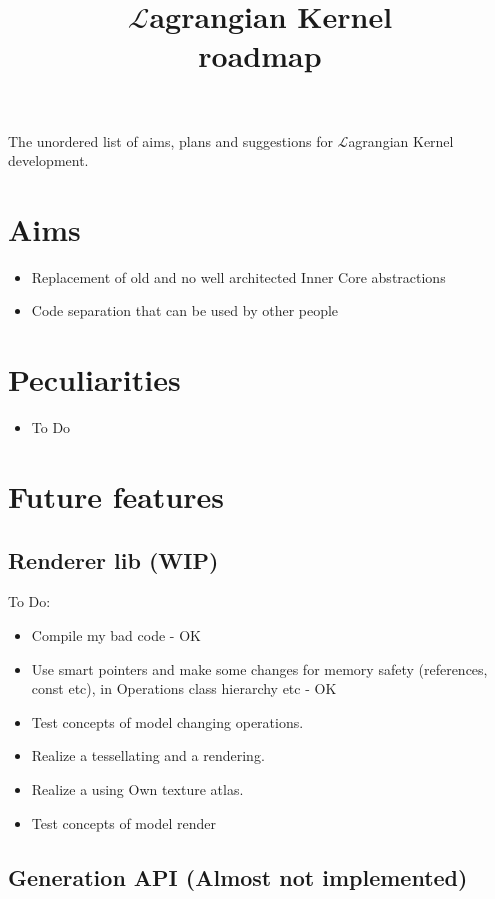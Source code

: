 \documentclass[12pt]{article}
\title{$\mathcal{L}$agrangian Kernel \\ roadmap}
\begin{document}
	\maketitle

	The unordered list of aims, plans and suggestions for $\mathcal{L}$agrangian Kernel development.

	\section{Aims}
	\begin{itemize}
		\item Replacement of old and no well architected Inner Core abstractions 
		\item Code separation that can be used by other people
	\end{itemize}

	\section{Peculiarities}

	\begin{itemize}
		\item To Do
	\end{itemize}

	\section{Future features}

	\subsection{Renderer lib (WIP)}
	To Do:

	\begin{itemize}
		\item Compile my bad code - OK
		\item Use smart pointers and make some changes for memory safety (references, const etc), in Operations class hierarchy etc - OK
		\item Test concepts of model changing operations.
		\item Realize a tessellating and a rendering.
		\item Realize a using Own texture atlas.
		\item Test concepts of model render
	\end{itemize}
	
	\subsection{Generation API (Almost not implemented)} 
	
\end{document}
